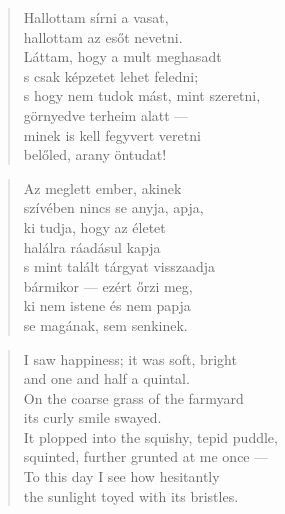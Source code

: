 \begin{verse}
  Hallottam sírni a vasat, \\
  hallottam az esőt nevetni. \\
  Láttam, hogy a mult meghasadt \\
  s csak képzetet lehet feledni; \\
  s hogy nem tudok mást, mint szeretni, \\
  görnyedve terheim alatt --- \\
  minek is kell fegyvert veretni \\
  belőled, arany öntudat!
\end{verse}

\bigskip



\begin{verse}
  Az meglett ember, akinek \\
  szívében nincs se anyja, apja, \\
  ki tudja, hogy az életet \\
  halálra ráadásul kapja \\
  s mint talált tárgyat visszaadja \\
  bármikor --- ezért őrzi meg, \\
  ki nem istene és nem papja \\
  se magának, sem senkinek.
\end{verse}

\newpage


\vspace*{-15mm}
\centeredornament





\begin{verse}
  I saw happiness; it was soft, bright \\
  and one and half a quintal. \\
  On the coarse grass of the farmyard \\
  its curly smile swayed. \\
  It plopped into the squishy, tepid puddle, \\
  squinted, further grunted at me once --- \\
  To this day I see how hesitantly \\
  the sunlight toyed with its bristles.
\end{verse}


